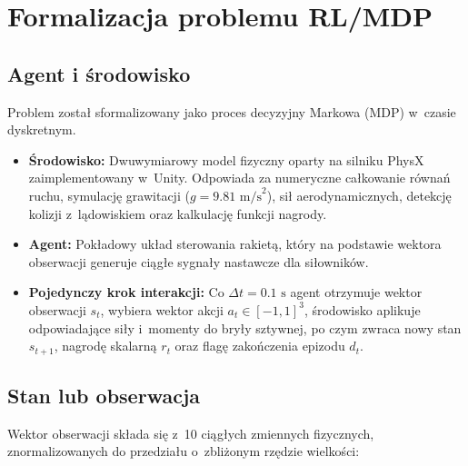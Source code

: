 \documentclass[12pt]{article}
\begin{document}
\section{Formalizacja problemu RL/MDP}

\subsection{Agent i środowisko}

Problem został sformalizowany jako proces decyzyjny Markowa (MDP) w~czasie dyskretnym. 
\begin{itemize}
    \item \textbf{Środowisko:} Dwuwymiarowy model fizyczny oparty na silniku PhysX zaimplementowany w~Unity. Odpowiada za numeryczne całkowanie równań ruchu, symulację grawitacji ($g = 9.81\text{ m/s}^2$), sił aerodynamicznych, detekcję kolizji z~lądowiskiem oraz kalkulację funkcji nagrody.
    \item \textbf{Agent:} Pokładowy układ sterowania rakietą, który na podstawie wektora obserwacji generuje ciągłe sygnały nastawcze dla siłowników.
    \item \textbf{Pojedynczy krok interakcji:} Co $\Delta t = 0.1\text{ s}$ agent otrzymuje wektor obserwacji $s_t$, wybiera wektor akcji $a_t \in [-1, 1]^3$, środowisko aplikuje odpowiadające siły i~momenty do bryły sztywnej, po czym zwraca nowy stan $s_{t+1}$, nagrodę skalarną $r_t$ oraz flagę zakończenia epizodu $d_t$.
\end{itemize}
\subsection{Stan lub obserwacja}
Wektor obserwacji składa się z~10 ciągłych zmiennych fizycznych, znormalizowanych do przedziału o~zbliżonym rzędzie wielkości:
\end{document}

